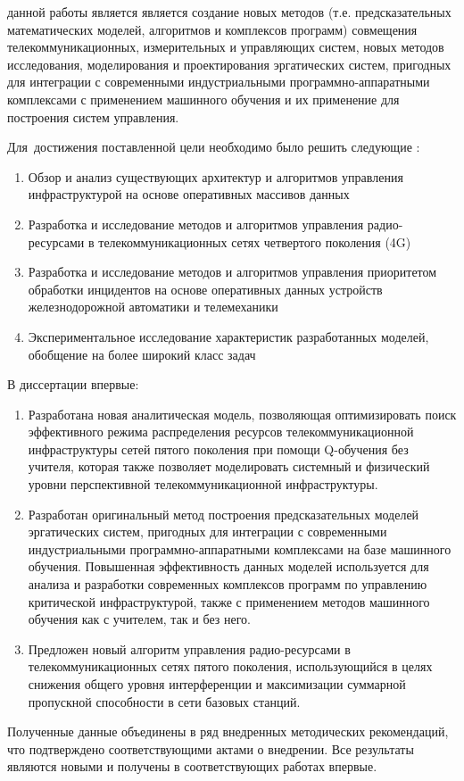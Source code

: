 
{\aim} данной работы является является создание новых методов (т.е. предсказательных математических моделей, алгоритмов и комплексов программ) совмещения телекоммуникационных, измерительных и управляющих систем, новых методов исследования, моделирования и проектирования эргатических систем, пригодных для интеграции с современными индустриальными программно-аппаратными комплексами с применением машинного обучения и их применение для построения систем управления.


Для~достижения поставленной цели необходимо было решить следующие {\tasks}:
\begin{enumerate}
  \item Обзор и анализ существующих архитектур и алгоритмов управления инфраструктурой на основе оперативных массивов данных
  \item Разработка и исследование методов и алгоритмов управления радио-ресурсами в телекоммуникационных сетях четвертого поколения (4G)
  \item Разработка и исследование методов и алгоритмов управления приоритетом обработки инцидентов на основе оперативных данных устройств железнодорожной автоматики и телемеханики
  \item Экспериментальное исследование характеристик разработанных моделей, обобщение на более широкий класс задач

\end{enumerate}

{\novelty}
В диссертации впервые:
\begin{enumerate}
\item Разработана новая аналитическая модель, позволяющая оптимизировать поиск эффективного режима распределения ресурсов телекоммуникационной инфраструктуры сетей пятого поколения при помощи Q-обучения без учителя, которая также позволяет моделировать системный и физический уровни перспективной телекоммуникационной инфраструктуры.
\item Разработан оригинальный метод построения предсказательных моделей эргатических систем, пригодных для интеграции с современными индустриальными программно-аппаратными комплексами на базе машинного обучения. Повышенная эффективность данных моделей используется для анализа и разработки современных комплексов программ по управлению критической инфраструктурой, также с применением методов машинного обучения как с учителем, так и без него.
\item Предложен новый алгоритм управления радио-ресурсами в телекоммуникационных сетях пятого поколения, использующийся в целях снижения общего уровня интерференции и максимизации суммарной пропускной способности в сети базовых станций.
\end{enumerate}
Полученные данные объединены в ряд внедренных методических рекомендаций, что подтверждено соответствующими актами о внедрении.
Все результаты являются новыми и получены в соответствующих работах впервые.

